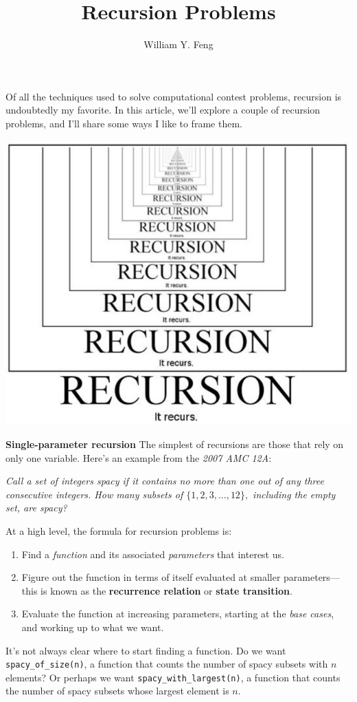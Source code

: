 \documentclass{article}
\title{Recursion Problems}
\author{William Y. Feng}
\begin{document}
\maketitle
Of all the techniques used to solve computational contest problems, recursion is undoubtedly my favorite. In this article, we'll explore a couple of recursion problems, and I'll share some ways I like to frame them.
\begin{center}
    \includegraphics[scale=0.6]{images/recursion.png}
\end{center}
\textbf{Single-parameter recursion}
The simplest of recursions are those that rely on only one variable. Here's an example from the \textit{2007 AMC 12A}:

\textit{Call a set of integers spacy if it contains no more than one out of any three consecutive integers. How many subsets of $\{1,2,3,\ldots,12\},$ including the empty set, are spacy?}

At a high level, the formula for recursion problems is:
\begin{enumerate}
\item Find a \textit{function} and its associated \textit{parameters} that interest us.
\item Figure out the function in terms of itself evaluated at smaller parameters—this is known as the \textbf{recurrence relation} or \textbf{state transition}.
\item Evaluate the function at increasing parameters, starting at the \textit{base cases}, and working up to what we want.
\end{enumerate}
It's not always clear where to start finding a function. Do we want \texttt{spacy\_of\_size(n)}, a function that counts the number of spacy subsets with $n$ elements? Or perhaps we want \texttt{spacy\_with\_largest(n)}, a function that counts the number of spacy subsets whose largest element is $n$.
\end{document}

